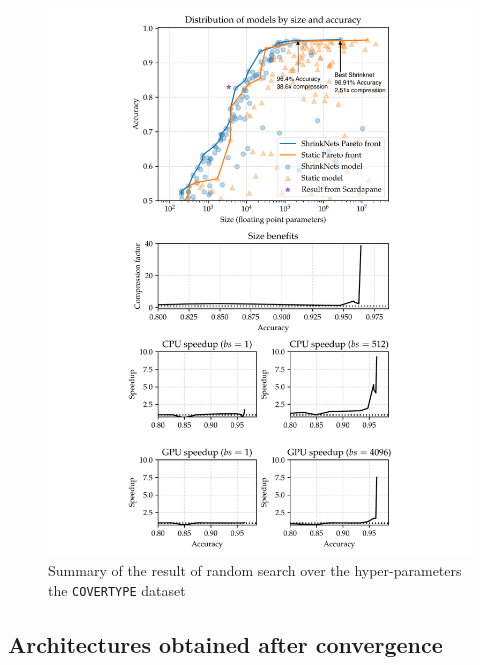 \begin{figure}[t]
\begin{minipage}{2.7in}
\begin{center}
\includegraphics[width=\columnwidth]{COVER_FC_summary-arrows}
\vspace*{-5mm}
\caption{\label{figure_COVER} Summary of the result of random
search over the hyper-parameters the \texttt{COVERTYPE} dataset
}
\end{center}
\vspace*{-4mm}
\end{minipage}
\end{figure}

\subsection{Architectures obtained after convergence}

